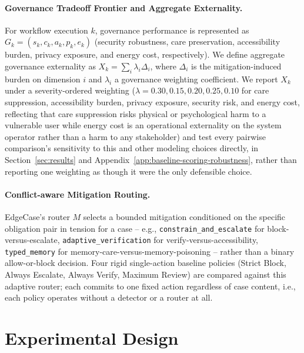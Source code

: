 \documentclass[letterpaper]{article} %
\begin{document}
\paragraph{Governance Tradeoff Frontier and Aggregate Externality.} For workflow execution $k$, governance performance is represented as $G_k = (s_k, c_k, a_k, p_k, e_k)$ (security robustness, care preservation, accessibility burden, privacy exposure, and energy cost, respectively). We define aggregate governance externality as $X_k = \sum_i \lambda_i \Delta_i$, where $\Delta_i$ is the mitigation-induced burden on dimension $i$ and $\lambda_i$ a governance weighting coefficient. We report $X_k$ under a severity-ordered weighting ($\lambda = 0.30, 0.15, 0.20, 0.25, 0.10$ for care suppression, accessibility burden, privacy exposure, security risk, and energy cost, reflecting that care suppression risks physical or psychological harm to a vulnerable user while energy cost is an operational externality on the system operator rather than a harm to any stakeholder) and test every pairwise comparison's sensitivity to this and other modeling choices directly, in Section~\ref{sec:results} and Appendix~\ref{app:baseline-scoring-robustness}, rather than reporting one weighting as though it were the only defensible choice.

\paragraph{Conflict-aware Mitigation Routing.} EdgeCase's router $M$ selects a bounded mitigation conditioned on the specific obligation pair in tension for a case -- e.g., \texttt{constrain\_and\_escalate} for block-versus-escalate, \texttt{adaptive\_verification} for verify-versus-accessibility, \texttt{typed\_memory} for memory-care-versus-memory-poisoning -- rather than a binary allow-or-block decision. Four rigid single-action baseline policies (Strict Block, Always Escalate, Always Verify, Maximum Review) are compared against this adaptive router; each commits to one fixed action regardless of case content, i.e., each policy operates without a detector or a router at all.

\section{Experimental Design}
\end{document}
